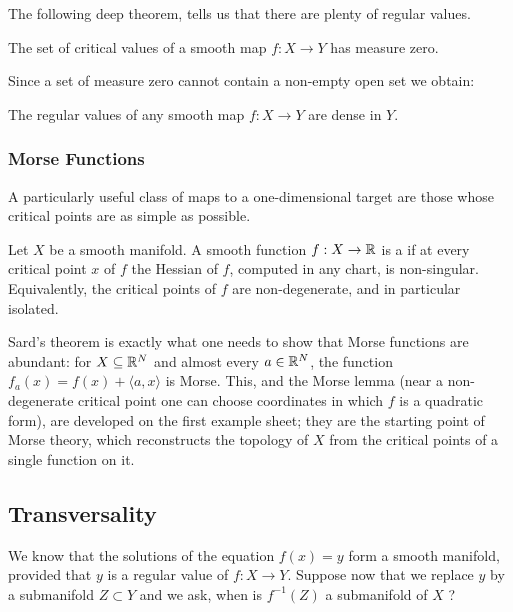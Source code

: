 \documentclass[a4paper]{scrartcl}
\begin{document}
The following deep theorem, tells us that there are plenty of regular values.

\begin{theorem}
    The set of critical values of a smooth map $f: X \rightarrow Y$ has measure zero.
\end{theorem}

Since a set of measure zero cannot contain a non-empty open set we obtain:

\begin{corollary}
    The regular values of any smooth map $f: X \rightarrow Y$ are dense in $Y$.
\end{corollary}

\subsubsection{Morse Functions}

A particularly useful class of maps to a one-dimensional target are those whose critical points are as simple as possible.

\begin{definition}
    Let $X$ be a smooth manifold. A smooth function $f: X \rightarrow \mathbb{R}$ is a  if at every critical point $x$ of $f$ the Hessian of $f$, computed in any chart, is non-singular. Equivalently, the critical points of $f$ are non-degenerate, and in particular isolated.
\end{definition}

Sard's theorem is exactly what one needs to show that Morse functions are abundant: for $X \subseteq \mathbb{R}^N$ and almost every $a \in \mathbb{R}^N$, the function $f_a(x) = f(x) + \langle a, x\rangle$ is Morse. This, and the Morse lemma (near a non-degenerate critical point one can choose coordinates in which $f$ is a quadratic form), are developed on the first example sheet; they are the starting point of Morse theory, which reconstructs the topology of $X$ from the critical points of a single function on it.


\subsection{Transversality}

We know that the solutions of the equation $f(x)=y$ form a smooth manifold, provided that $y$ is a regular value of $f: X \rightarrow Y$. Suppose now that we replace $y$ by a submanifold $Z \subset Y$ and we ask, when is $f^{-1}(Z)$ a submanifold of $X$ ?
\end{document}

